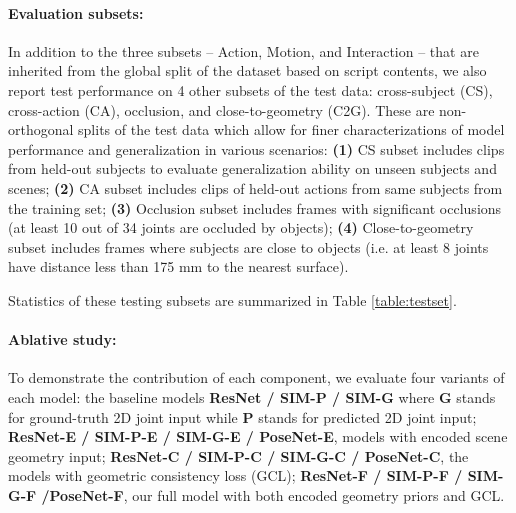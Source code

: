 \documentclass[times,referee,twocolumn,final,authoryear]{elsarticle}
\begin{document}
\paragraph{Evaluation subsets:} In addition to the three subsets --
Action, Motion, and Interaction -- that are inherited from the global split of the dataset
based on script contents, we also report test performance on 4 other subsets of the
test data: cross-subject (CS), cross-action (CA), occlusion, and close-to-geometry (C2G).
These are non-orthogonal splits of the test data which allow for finer characterizations 
of model performance and generalization in various scenarios:
\textbf{(1)} CS subset includes clips from held-out subjects to evaluate
generalization ability on unseen subjects and scenes; \textbf{(2)} CA subset includes
clips of held-out actions from same subjects from the training set;
\textbf{(3)} Occlusion subset includes frames with significant occlusions (at
least 10 out of 34 joints are occluded by objects); \textbf{(4)} Close-to-geometry
subset includes frames where subjects are close to objects (i.e. at least 8
joints have distance less than 175 mm to the nearest surface).

Statistics of these testing subsets are summarized in Table \ref{table:testset}.


\paragraph{Ablative study:} To demonstrate the contribution of each component, we
evaluate four variants of each model: the baseline models \textbf{ResNet / SIM-P / SIM-G} 
where \textbf{G} stands for ground-truth 2D joint input while \textbf{P} stands for predicted
2D joint input;
\textbf{ResNet-E / SIM-P-E / SIM-G-E / PoseNet-E}, models with encoded scene geometry
input; \textbf{ResNet-C / SIM-P-C / SIM-G-C / PoseNet-C}, the models with geometric consistency loss (GCL); \textbf{ResNet-F / SIM-P-F / SIM-G-F /PoseNet-F}, our full model
with both encoded geometry priors and GCL.
\end{document}
